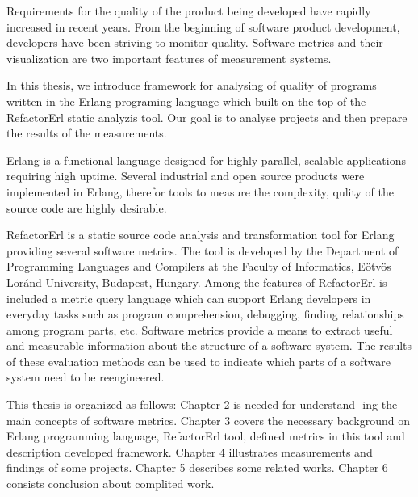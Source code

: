Requirements for the quality of the product being developed have rapidly increased in recent years. From the beginning of software product development, developers have been striving to monitor quality. Software metrics and their visualization are two important features of measurement systems. 

In this thesis, we introduce framework for analysing of quality of programs written in the Erlang programing language which built on the top of the RefactorErl static analyzis tool. Our goal is to analyse
projects and then prepare the results of the measurements.

Erlang is a functional language designed for highly parallel, scalable applications requiring high uptime. Several industrial and open source products were implemented in Erlang, therefor tools to measure the complexity, qulity of the source code are highly desirable. 

RefactorErl is a static source code analysis and transformation tool for Erlang providing several software metrics. The tool is developed by the Department of Programming Languages and Compilers at the Faculty of Informatics, Eötvös Loránd University, Budapest, Hungary. 
Among the features of RefactorErl is included a metric query language which can support Erlang developers in everyday tasks such as program comprehension, debugging, finding relationships among program parts, etc.
Software metrics provide a means to extract useful and measurable information about the structure of a software system.
The results of these evaluation methods can be used to indicate which parts of a software system need to be reengineered.

This thesis is organized as follows: Chapter 2 is needed for understand-
ing the main concepts of software metrics. Chapter 3 covers the necessary background on Erlang programming language, RefactorErl tool, defined metrics  in this tool and description developed framework. Chapter 4 illustrates measurements and findings of some projects. Chapter 5 describes some related works. Chapter 6 consists conclusion about complited work.

